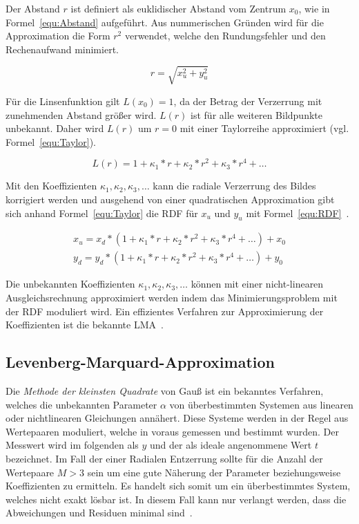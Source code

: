 Der Abstand $r$ ist definiert als euklidischer Abstand vom Zentrum $x_0$, wie in Formel~\ref{equ:Abstand} aufgeführt. Aus nummerischen Gründen wird für die Approximation die Form $r^2$ verwendet, welche den Rundungsfehler und den Rechenaufwand minimiert. 

\begin{equation}
\label{equ:Abstand}
r = \sqrt{x_u^2+y_u^2}
\end{equation}

 Für die Linsenfunktion gilt $L(x_0)=1$, da der Betrag der Verzerrung mit zunehmenden Abstand größer wird. $L(r)$ ist für alle weiteren Bildpunkte unbekannt. Daher wird $L(r)$ um $r=0$ mit einer Taylorreihe approximiert (vgl. Formel~\ref{equ:Taylor}). 
 
 \begin{equation}
 \label{equ:Taylor}
 L(r)=1+\kappa_1*r+\kappa_2*r^2+\kappa_3*r^4 + \dots
 \end{equation}

Mit den Koeffizienten $\kappa_1, \kappa_2, \kappa_3, \dots$ kann die radiale Verzerrung des Bildes korrigiert werden und ausgehend von einer quadratischen Approximation gibt sich anhand Formel~\ref{equ:Taylor} die RDF für $x_u$ und $y_u$ mit Formel~\ref{equ:RDF}~\cite{WangRaddist}.

\begin{equation}
\label{equ:RDF}
\begin{split}
x_u = x_d*(1+\kappa_1*r+\kappa_2*r^2+\kappa_3*r^4 + \dots) + x_0\\
y_d = y_d*(1+\kappa_1*r+\kappa_2*r^2+\kappa_3*r^4 + \dots) + y_0
\end{split}
\end{equation}

Die unbekannten Koeffizienten $\kappa_1, \kappa_2, \kappa_3, \dots$ können mit einer nicht-linearen Ausgleichsrechnung approximiert werden indem das Minimierungsproblem mit der RDF moduliert wird. Ein effizientes Verfahren zur Approximierung der Koeffizienten ist die bekannte LMA~\cite{LevMarquardt}.

\subsection{Levenberg-Marquard-Approximation}
Die \textit{Methode der kleinsten Quadrate} von Gauß ist ein bekanntes Verfahren, welches die unbekannten Parameter $\alpha$ von überbestimmten Systemen aus linearen oder nichtlinearen Gleichungen annähert. Diese Systeme werden in der Regel aus Wertepaaren moduliert, welche in voraus gemessen und bestimmt wurden. Der Messwert wird im folgenden als $y$ und der als ideale angenommene Wert $t$ bezeichnet.
Im Fall der einer Radialen Entzerrung sollte für die Anzahl der Wertepaare $M>3$ sein um eine gute Näherung der Parameter beziehungsweise Koeffizienten zu ermitteln.
Es handelt sich somit um ein überbestimmtes System, welches nicht exakt lösbar ist. In diesem Fall kann nur verlangt werden, dass die Abweichungen und Residuen minimal sind~\cite{schwarz2011numerische}. 

